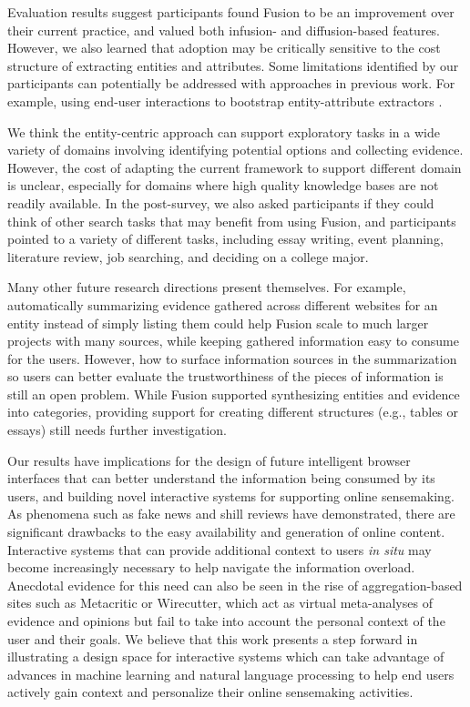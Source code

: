 Evaluation results suggest participants found Fusion to be an improvement over their current practice, and valued both infusion- and diffusion-based features. However, we also learned that adoption may be critically sensitive to the cost structure of extracting entities and attributes. Some limitations identified by our participants can potentially be addressed with approaches in previous work. For example, using end-user interactions to bootstrap entity-attribute extractors \cite{thresher,bier2006entity}.

We think the entity-centric approach can support exploratory tasks in a wide variety of domains involving identifying potential options and collecting evidence. However, the cost of adapting the current framework to support different domain is unclear, especially for domains where high quality knowledge bases are not readily available. In the post-survey, we also asked participants if they could think of other search tasks that may benefit from using Fusion, and participants pointed to a variety of different tasks, including essay writing, event planning, literature review, job searching, and deciding on a college major. 


Many other future research directions present themselves. For example, automatically summarizing evidence gathered across different websites for an entity instead of simply listing them could help Fusion scale to much larger projects with many sources, while keeping gathered information easy to consume for the users. However, how to surface information sources in the summarization so users can better evaluate the trustworthiness of the pieces of information is still an open problem. While Fusion supported synthesizing entities and evidence into categories, providing support for creating different structures (e.g., tables or essays) still needs further investigation.

Our results have implications for the design of future intelligent browser interfaces that can better understand the information being consumed by its users, and building novel interactive systems for supporting online sensemaking. As phenomena such as fake news and shill reviews have demonstrated, there are significant drawbacks to the easy availability and generation of online content. Interactive systems that can provide additional context to users \emph{in situ} may become increasingly necessary to help navigate the information overload. Anecdotal evidence for this need can also be seen in the rise of aggregation-based sites such as Metacritic or Wirecutter, which act as virtual meta-analyses of evidence and opinions but fail to take into account the personal context of the user and their goals. We believe that this work presents a step forward in illustrating a design space for interactive systems which can take advantage of advances in machine learning and natural language processing to help end users actively gain context and personalize their online sensemaking activities.


